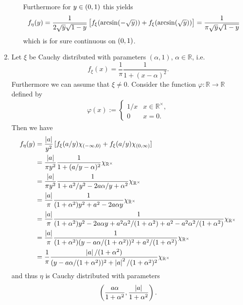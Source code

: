 \begin{enumerate}[label = \textbf{Exercise \arabic*.},wide = 0pt, itemsep=1.5ex]
\begin{enumerate}[label = \arabic*.,wide = 0pt, itemsep=1.5ex]
				Furthermore for $y \in \intoo{0,1}$ this yields
				\begin{equation}
					f_\eta(y) = \frac{1}{2\sqrt{y}\sqrt{1 - y}}\sbr{f_\xi(\arcsin(-\sqrt{y})) + f_\xi(\arcsin(\sqrt{y}))} = \frac{1}{\pi\sqrt{y}\sqrt{1 - y}}
				\end{equation}
				\noindent which is for sure continuous on $\intoo{0,1}$.
		\end{enumerate}
	\item Let $\xi$ be Cauchy distributed with parameters $(\alpha,1)$, $\alpha \in \mathbb{R}$, i.e.
		\begin{equation}
			f_\xi(x) = \frac{1}{\pi}\frac{1}{1 + (x - \alpha)^2}.
		\end{equation}
		Furthermore we can assume that $\xi \neq 0$. Consider the function $\varphi: \mathbb{R} \to \mathbb{R}$ defined by 
		\begin{align*}
			\varphi(x) := \begin{cases}
				1/x & x \in \mathbb{R}^\times,\\
				0 & x = 0.
			\end{cases}
		\end{align*}
		Then we have
		\begin{align*}
			f_\eta(y) &= \frac{\abs[0]{a}}{y^2} \sbr[0]{f_\xi(a/y)\chi_{\intoo{-\infty,0}} + f_\xi(a/y)\chi_{\intoo{0,\infty}}}\\
			&= \frac{\abs[0]{a}}{\pi y^2} \frac{1}{1 + (a/y - \alpha)^2}\chi_{\mathbb{R}^\times}\\
			&=\frac{\abs[0]{a}}{\pi y^2} \frac{1}{1 + a^2/y^2 - 2a\alpha/y + \alpha^2}\chi_{\mathbb{R}^\times}\\
			&= \frac{\abs[0]{a}}{\pi} \frac{1}{(1 + \alpha^2)y^2 + a^2 - 2a\alpha y}\chi_{\mathbb{R}^\times}\\
			&= \frac{\abs[0]{a}}{\pi}\frac{1}{(1 + \alpha^2)y^2 - 2a\alpha y + a^2\alpha^2/(1 + \alpha^2) + a^2 - a^2\alpha^2/(1 + \alpha^2)}\chi_{\mathbb{R}^\times}\\
			&= \frac{\abs[0]{a}}{\pi}\frac{1}{(1 + \alpha^2)(y - a\alpha/(1 + \alpha^2))^2 + a^2/(1 + \alpha^2)}\chi_{\mathbb{R}^\times}\\
			&= \frac{1}{\pi}\frac{\abs[0]{a}/(1 + \alpha^2)}{(y - a\alpha/(1 + \alpha^2))^2 + \abs[0]{a}^2/(1 + \alpha^2)^2}\chi_{\mathbb{R}^\times}
		\end{align*}
		\noindent and thus $\eta$ is Cauchy distributed with parameters
		\begin{equation}
			\del{\frac{a\alpha}{1 + \alpha^2},\frac{\abs[0]{a}}{1 + \alpha^2}}.

\end{equation}
\end{enumerate}
